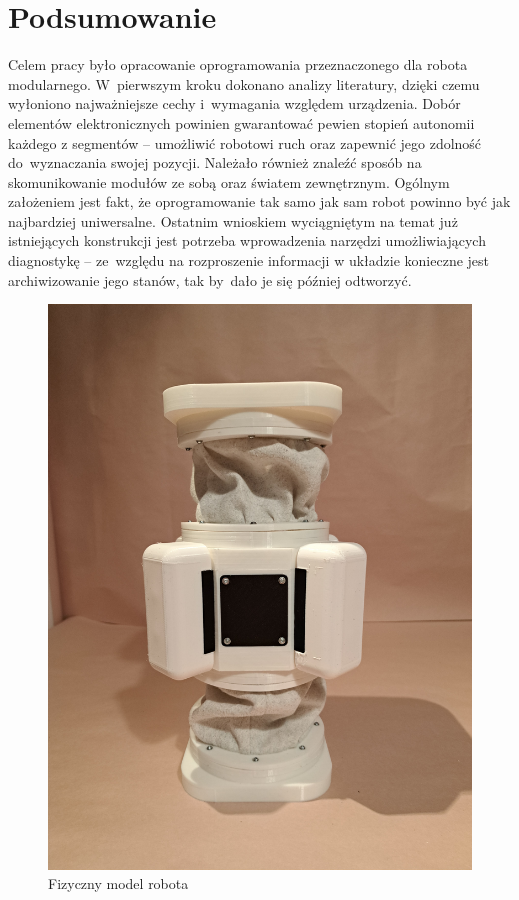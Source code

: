 \chapter{Podsumowanie}

Celem pracy było opracowanie oprogramowania przeznaczonego dla robota modularnego. W~pierwszym kroku dokonano analizy literatury, dzięki czemu wyłoniono najważniejsze cechy i~wymagania względem urządzenia. Dobór elementów elektronicznych powinien gwarantować pewien stopień autonomii każdego z segmentów -- umożliwić robotowi ruch oraz zapewnić jego zdolność do~wyznaczania swojej pozycji. Należało również znaleźć sposób na skomunikowanie modułów ze sobą oraz światem zewnętrznym. Ogólnym założeniem jest fakt, że oprogramowanie tak samo jak sam robot powinno być jak najbardziej uniwersalne. Ostatnim wnioskiem wyciągniętym na temat już istniejących konstrukcji jest potrzeba wprowadzenia narzędzi umożliwiających diagnostykę -- ze~względu na rozproszenie informacji w układzie konieczne jest archiwizowanie jego stanów, tak by~dało je się później odtworzyć. 

\begin{figure}[ht!]
    \centering
    \includegraphics[width=0.8\linewidth, angle = -90 ]{rysunki/gizmo/gizmo_real.jpg}
    \caption{Fizyczny model robota}
    \label{fig: gizmo_real}
\end{figure} 

